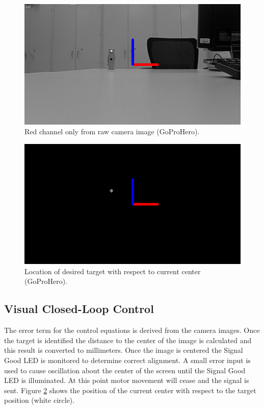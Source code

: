 \documentclass[botnum, fleqn]{unmeethesis}
\begin{document}
\begin{figure}[ht]
 \begin{center}
  \includegraphics[width=0.5 \textwidth]{figures/bw.png}
  \caption{\small \label{fig:bw} Red channel only from raw camera image (GoProHero).}
 \end{center}
\end{figure}

\begin{figure}[ht]
 \begin{center}
  \includegraphics[width=0.5 \textwidth]{figures/dot.png}
  \caption{\small \label{fig:dot} Location of desired target with respect to current center (GoProHero).}
 \end{center}
\end{figure}


\subsection*{Visual Closed-Loop Control}

The error term for the control equations is derived from the camera images. Once the target is identified the distance to the center of the image is calculated and this result is converted to millimeters. Once the image is centered the Signal Good LED is monitored to determine correct alignment. A small error input is used to cause oscillation about the center of the screen until the Signal Good LED is illuminated. At this point motor movement will cease and the signal is sent. Figure \ref{fig:dot} shows the position of the current center with respect to the target position (white circle).
\end{document}
